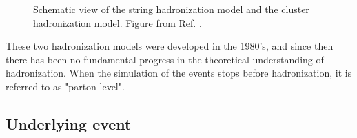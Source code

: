 \begin{figure}[h]
\begin{center}
\end{center}
 \caption{Schematic view of  the string hadronization model and  the cluster hadronization model. 
 Figure from Ref. \cite{Isildak:2013kfa}.}
  \label{fig:had_model}
\end{figure}


These two hadronization models were developed in the 1980's, and since then there has been no fundamental progress in the theoretical understanding of hadronization. 
When the simulation of the events stops before hadronization, it is referred to as "parton-level".

\subsection{Underlying event}

